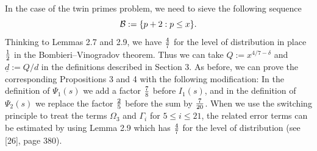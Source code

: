 \vskip 5mm


\medskip

In the case of the twin primes problem, we need to sieve the following sequence
$${\cal B} := \{p+2 : p\le x\}.$$
Thinking to Lemmas 2.7 and 2.9,
we have ${4\over 7}$ for the level of distribution
in place ${1\over 2}$ in the Bombieri--Vinogradov theorem.
Thus we can take $Q := x^{4/7-\delta}$ and $\underline d := Q/d$
in the definitions described in Section 3.
As before, we can prove the corresponding Propositions 3 and 4 with the 
following modification:
In the definition of $\Psi_1(s)$ we add a factor ${7\over 8}$ before $I_1(s)$,
and in the definition of $\Psi_2(s)$
we replace the factor ${2\over 5}$ before the sum by ${7\over 20}$.
When we use the switching principle to treat the terms $\Omega_3$ and $\Gamma_i$ for $5\le i\le 21$,
the related error terms can be estimated by using Lemma 2.9 
which has ${4\over 7}$ for the level of distribution (see [26], page 380).

\bigskip

